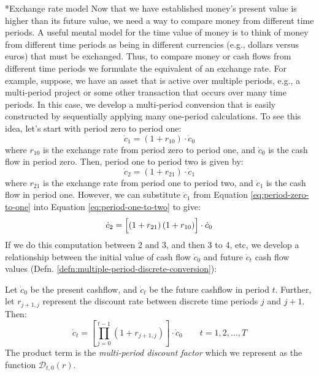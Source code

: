 \documentclass[11pt]{article}
\makeatletter
\theoremstyle{definition}
\renewcommand\subsection{\@startsection
	{subsection}{2}{0mm}
	{-0.05in}
	{0.5\baselineskip}
	{\normalfont\normalsize\bfseries}}
\makeatother
\begin{document}
\subsection*{Exchange rate model}
Now that we have established money’s present value is higher than its future value, we need a way to compare money from different time periods. 
A useful mental model for the time value of money is to think of money from different time periods 
as being in different currencies (e.g., dollars versus euros) that must be exchanged. 
Thus, to compare money or cash flows from different time periods we formulate the equivalent of an exchange rate. 
For example, suppose, we have an asset that is active over multiple periods, e.g., a multi-period project or some other transaction that occurs over many time periods. 
In this case, we develop a multi-period conversion that is easily constructed by sequentially applying many one-period calculations. 
To see this idea, let's start with period zero to period one:
\begin{equation}\label{eq:period-zero-to-one}
\dot{c}_{1} = \left(1+r_{10}\right)\cdot\dot{c}_{0}
\end{equation}
where $r_{10}$ is the exchange rate from period zero to period one, and $\dot{c}_{0}$ is the cash flow in period zero.
Then, period one to period two is given by:
\begin{equation}\label{eq:period-one-to-two}
\dot{c}_{2} = \left(1+r_{21}\right)\cdot\dot{c}_{1}
\end{equation}
where $r_{21}$ is the exchange rate from period one to period two, and $\dot{c}_{1}$ is the cash flow in period one. 
However, we can substitute $\dot{c}_{1}$ from Equation \ref{eq:period-zero-to-one} into Equation \ref{eq:period-one-to-two} to give:
\begin{equation}\label{eq:period-one-to-two-substituted}
\dot{c}_{2} = \Bigl[\left(1+r_{21}\right)\left(1+r_{10}\right)\Bigr]\cdot\dot{c}_{0}
\end{equation}
If we do this computation between 2 and 3, and then 3 to 4, etc, we develop a relationship between the initial value of cash flow 
$\dot{c}_{0}$ and future $\dot{c}_{t}$ cash flow values (Defn. \ref{defn:multiple-period-discrete-conversion}):

\begin{definition}\label{defn:multiple-period-discrete-conversion}
Let $\dot{c}_0$ be the present cashflow, and $\dot{c}_t$ be the future cashflow in period $t$. 
Further, let $r_{j+1,j}$ represent the discount rate between discrete time periods $j$ and $j+1$. Then: 
\begin{equation}
\dot{c}_{t} = \left[\prod_{j=0}^{t-1}\left(1+r_{j+1,j}\right)\right]\cdot\dot{c}_{0}\qquad{t=1,2,\dots,T}
\end{equation}
The product term is the \textit{multi-period discount factor} which we represent as the function $\mathcal{D}_{t,0}(r)$.
\end{definition}
\end{document}
